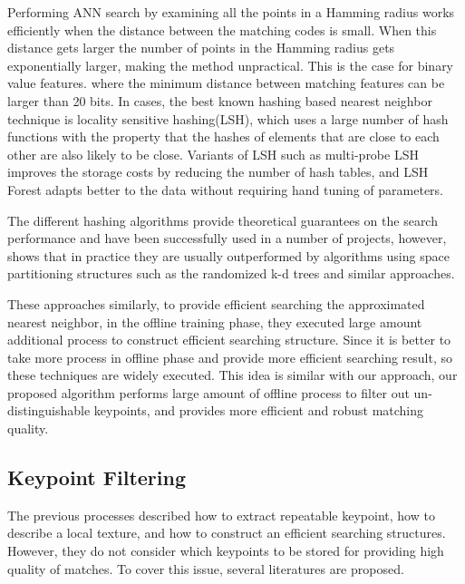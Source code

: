 Performing ANN search by examining all the points in a Hamming radius works efficiently when the distance between the matching codes is small. When this distance gets larger the number of points in the Hamming radius gets exponentially larger, making the method unpractical. This is the case for binary value features. where the minimum distance between matching features can be larger than 20 bits. In cases, the best known hashing based nearest neighbor technique is locality sensitive hashing(LSH)\cite{gionis_similarity_1999, andoni_near-optimal_2006}, which uses a large number of hash functions with the property that the hashes of elements that are close to each other are also likely to be close. Variants of LSH such as multi-probe LSH\cite{lv_multi-probe_2007} improves the storage costs by reducing the number of hash tables, and LSH Forest \cite{bawa_lsh_2005} adapts better to the data without requiring hand tuning of parameters.

The different hashing algorithms provide theoretical guarantees on the search performance and have been successfully used in a number of projects, however, \cite{muja_scalable_2014} shows that in practice they are usually outperformed by algorithms using space partitioning structures such as the randomized k-d trees and similar approaches.

These approaches similarly, to provide efficient searching the approximated nearest neighbor, in the offline training phase, they executed large amount additional process to construct efficient searching structure. Since it is better to take more process in offline phase and provide more efficient searching result, so these techniques are widely executed. This idea is similar with our approach, our proposed algorithm performs large amount of offline process to filter out un-distinguishable keypoints, and provides more efficient and robust matching quality. 



\subsection{Keypoint Filtering}
The previous processes described how to extract repeatable keypoint, how to describe a local texture, and how to construct an efficient searching structures. However, they do not consider which keypoints to be stored for providing high quality of matches. To cover this issue, several literatures are proposed. 

